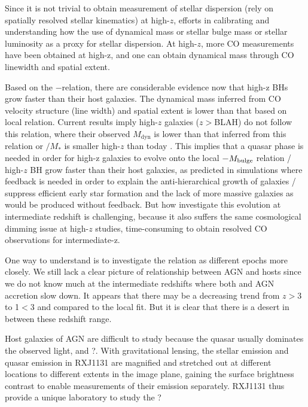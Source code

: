 \documentclass[]{emulateapj}
\begin{document}
Since it is not trivial to obtain measurement of stellar dispersion (rely on spatially resolved stellar kinematics) at high-$z$, 
efforts in calibrating and understanding how 
the use of dynamical mass or stellar bulge mass \citep[\eg][]{Peng06a} or 
stellar luminosity as a proxy for stellar dispersion.
At high-$z$, more CO measurements have been obtained at high-z, and
one can obtain dynamical mass through CO linewidth and spatial extent. 

Based on the \mbh$-$\mdyn relation, there are considerable evidence now that high-z BHs grow faster than their host galaxies.
The dynamical mass inferred from CO velocity structure (line width) and spatial extent is lower than that 
based on local relation. 
Current results imply high-$z$ galaxies ($z$$>$BLAH) do not follow this relation, where their observed $M_\textrm{dyn}$ is lower than that inferred from
this relation or \mbh$/$$M_{*}$ is smaller high-$z$ than today \citep{Borys05a}. 
This implies that a quasar phase is needed in order for high-z galaxies to evolve 
onto the local \mbh$-$$M_{\rm bulge}$ relation / high-$z$ BH grow faster than their host galaxies, 
as predicted in simulations where feedback is needed in order to explain the 
anti-hierarchical growth of galaxies / suppress efficient early star formation
and the lack of more massive galaxies as would be produced without feedback. 
But how investigate this evolution at intermediate redshift is challenging,
because it also suffers the same cosmological dimming issue at high-$z$ studies, time-consuming to obtain
resolved CO observations for intermediate-z.


One way to understand is to investigate the relation as different epochs more closely.
We still lack a clear picture of relationship between AGN and hosts since we do not know much at the intermediate redshifts where both \SF and AGN accretion slow down.
It appears that there may be a decreasing trend from $z$$>$3 to 1$<$3 and compared to the local fit.
But it is clear that there is a desert in between these redshift range.

Host galaxies of AGN are difficult to study because the quasar usually dominates the observed light, and ?.
With gravitational lensing, the stellar emission and quasar emission in RXJ1131 
are magnified and stretched out at different locations to different extents in the image plane, gaining 
the surface brightness contrast to enable measurements of their emission separately.
RXJ1131 thus provide a unique laboratory to study the ? 
\end{document}
